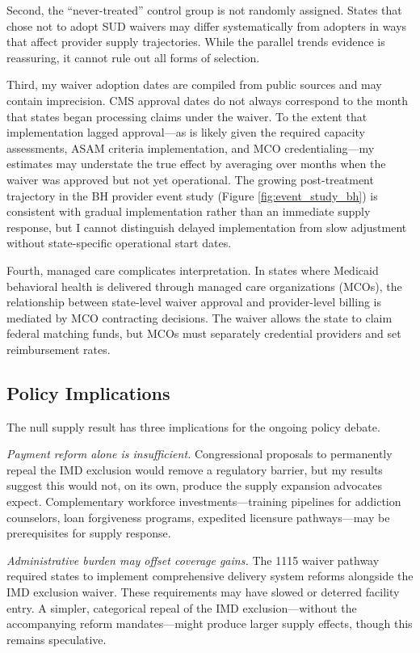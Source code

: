 \documentclass[12pt]{article}
\begin{document}
Second, the ``never-treated'' control group is not randomly assigned. States that chose not to adopt SUD waivers may differ systematically from adopters in ways that affect provider supply trajectories. While the parallel trends evidence is reassuring, it cannot rule out all forms of selection.

Third, my waiver adoption dates are compiled from public sources and may contain imprecision. CMS approval dates do not always correspond to the month that states began processing claims under the waiver. To the extent that implementation lagged approval---as is likely given the required capacity assessments, ASAM criteria implementation, and MCO credentialing---my estimates may understate the true effect by averaging over months when the waiver was approved but not yet operational. The growing post-treatment trajectory in the BH provider event study (Figure \ref{fig:event_study_bh}) is consistent with gradual implementation rather than an immediate supply response, but I cannot distinguish delayed implementation from slow adjustment without state-specific operational start dates.

Fourth, managed care complicates interpretation. In states where Medicaid behavioral health is delivered through managed care organizations (MCOs), the relationship between state-level waiver approval and provider-level billing is mediated by MCO contracting decisions. The waiver allows the state to claim federal matching funds, but MCOs must separately credential providers and set reimbursement rates.

\subsection{Policy Implications}

The null supply result has three implications for the ongoing policy debate.

\textit{Payment reform alone is insufficient.} Congressional proposals to permanently repeal the IMD exclusion would remove a regulatory barrier, but my results suggest this would not, on its own, produce the supply expansion advocates expect. Complementary workforce investments---training pipelines for addiction counselors, loan forgiveness programs, expedited licensure pathways---may be prerequisites for supply response.

\textit{Administrative burden may offset coverage gains.} The 1115 waiver pathway required states to implement comprehensive delivery system reforms alongside the IMD exclusion waiver. These requirements may have slowed or deterred facility entry. A simpler, categorical repeal of the IMD exclusion---without the accompanying reform mandates---might produce larger supply effects, though this remains speculative.
\end{document}
